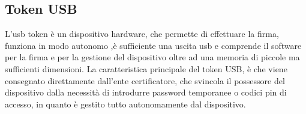 \newpage

\subsection{Token USB}

L'usb token è un dispositivo hardware, che permette di effettuare la firma, funziona in modo autonomo ,è sufficiente una uscita usb e comprende il software per la firma e per la gestione del dispositivo oltre ad una memoria di piccole ma sufficienti dimensioni. La caratteristica principale del token USB, è che viene consegnato direttamente dall'ente certificatore, che svincola il possessore del dispositivo dalla necessità di introdurre password temporanee o codici pin di accesso, in quanto è gestito tutto autonomamente dal dispositivo.